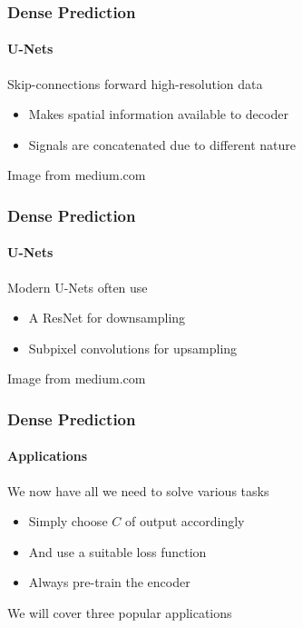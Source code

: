 \documentclass[xetex,professionalfont]{beamer}
\begin{document}
\begin{frame}
	\frametitle{Dense Prediction}
	\framesubtitle{U-Nets}

	Skip-connections forward high-resolution data
	\begin{itemize}
		\item Makes spatial information available to decoder
		\item Signals are concatenated due to different nature %
	\end{itemize}

	\bigskip

	\begin{center}
		{\centering Image from medium.com}
	\end{center}

\end{frame}


\begin{frame}
	\frametitle{Dense Prediction}
	\framesubtitle{U-Nets}

	Modern U-Nets often use
	\begin{itemize}
		\item A ResNet for downsampling
		\item Subpixel convolutions for upsampling
	\end{itemize}

	\bigskip

	\begin{center}
		{\centering Image from medium.com}
	\end{center}

\end{frame}


\begin{frame}
	\frametitle{Dense Prediction}
	\framesubtitle{Applications}

	We now have all we need to solve various tasks
	\begin{itemize}
		\item Simply choose $C$ of output accordingly
		\item And use a suitable loss function
		\item Always pre-train the encoder
	\end{itemize}

	\bigskip
	We will cover three popular applications

\end{frame}
\end{document}
